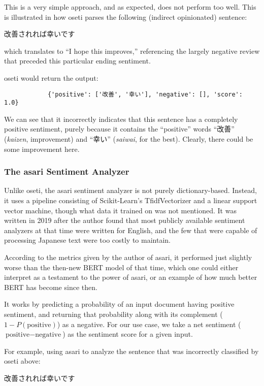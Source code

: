 \documentclass[12pt]{article}
\begin{document}
	This is a very simple approach, and as expected, does not perform too well. This is illustrated in how oseti parses the following (indirect opinionated) sentence: \begin{center}
		改善されれば幸いです
	\end{center} which translates to ``I hope this improves,'' referencing the largely negative review that preceded this particular ending sentiment.
	
	oseti would return the output: \begin{center}
		\begin{verbatim}
			{'positive': ['改善', '幸い'], 'negative': [], 'score': 1.0}
		\end{verbatim}
	\end{center}
	
	We can see that it incorrectly indicates that this sentence has a completely positive sentiment, purely because it contains the ``positive'' words ``改善'' (\textit{kaizen}, improvement) and ``幸い'' (\textit{saiwai}, for the best). Clearly, there could be some improvement here.
	
	\subsubsection{The asari Sentiment Analyzer}
	
	Unlike oseti, the asari sentiment analyzer is not purely dictionary-based. Instead, it uses a pipeline consisting of Scikit-Learn's TfidfVectorizer and a linear support vector machine, though what data it trained on was not mentioned. It was written in 2019 after the author found that most publicly available sentiment analyzers at that time were written for English, and the few that were capable of processing Japanese text were too costly to maintain.
	
	According to the metrics given by the author of asari, it performed just slightly worse than the then-new BERT model of that time, which one could either interpret as a testament to the power of asari, or an example of how much better BERT has become since then.
	
	It works by predicting a probability of an input document having positive sentiment, and returning that probability along with its complement ($1-P(\text{positive})$) as a negative. For our use case, we take a net sentiment ($\text{positive} - \text{negative}$) as the sentiment score for a given input.
	
	For example, using asari to analyze the sentence that was incorrectly classified by oseti above: \begin{center}
		改善されれば幸いです
	\end{center}
	
\end{document}
